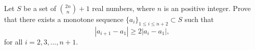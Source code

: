 Let \(S\) be a set of \(\binom{2n}{n} + 1\) real numbers, where \(n\) is an positive integer. Prove that there exists a monotone sequence \(\{a_i\}_{1\leq i \leq n+2} \subset S\) such that
\[ |a_{i+1} - a_1 | \geq 2 | a_i - a_1 | , \]
for all \(i=2,3,\ldots, n+1\).